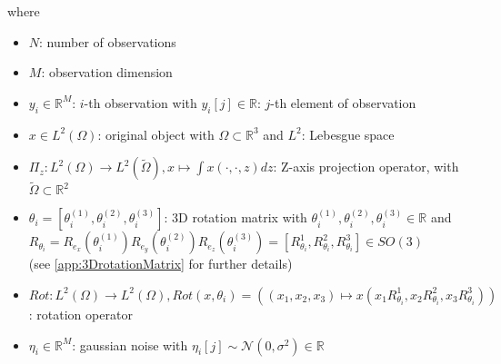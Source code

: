 where 
\begin{itemize}
    \item $N$: number of observations
    \item $M$: observation dimension
    \item $y_i \in \mathbb{R}^M$:  $i$-th observation with $y_i[j] \in \mathbb{R}$: $j$-th element of observation
    \item $x \in L^2(\Omega)$: original object with $\Omega \subset \mathbb{R}^3 $ and $L^2$: Lebesgue space
    \item $\Pi_z : L^2(\Omega) \to L^2(\tilde{\Omega}), x \mapsto  \int x(\cdot,\cdot,z) dz$: Z-axis projection operator,
          with $\tilde{\Omega} \subset \mathbb{R}^2$
    \item $\theta_i = [\theta_i^{(1)}, \theta_i^{(2)}, \theta_i^{(3)} ] $: 3D rotation matrix with $ \theta_i^{(1)}, \theta_i^{(2)}, \theta_i^{(3)} \in \mathbb{R}$ and \\
          $R_{\theta_i} =  R_{e_x} (\theta_i^{(1)}) R_{e_y} (\theta_i^{(2)}) R_{e_z} (\theta_i^{(3)}) = [R^1_{\theta_i}, R^2_{\theta_i}, R^3_{\theta_i}] \in SO(3)$ \\
          (see \ref{app:3DrotationMatrix} for further details)
    \item $Rot : L^2(\Omega) \to L^2(\Omega), Rot(x, \theta_i) = \left((x_1,x_2,x_3) \mapsto x( x_1R^1_{\theta_i}, x_2R^2_{\theta_i}, x_3R^3_{\theta_i})\right)$: rotation operator
    \item $\eta_i \in \mathbb{R}^M$: gaussian noise with $\eta_i[j] \sim \mathcal{N}(0,\sigma^2) \in \mathbb{R}$
\end{itemize}




